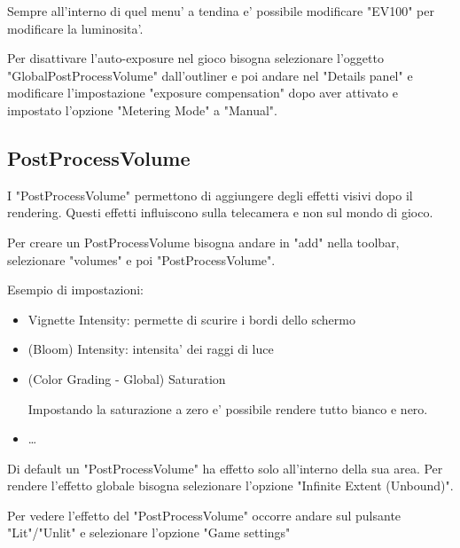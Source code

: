             Sempre all'interno di quel menu' a tendina e' possibile modificare "EV100" per modificare la luminosita'.

            Per disattivare l'auto-exposure nel gioco bisogna selezionare l'oggetto "GlobalPostProcessVolume" dall'outliner e poi andare nel "Details panel" e modificare l'impostazione  "exposure compensation" dopo aver attivato e impostato l'opzione "Metering Mode" a "Manual".


        \subsection{PostProcessVolume}
            I "PostProcessVolume" permettono di aggiungere degli effetti visivi dopo il rendering. Questi effetti influiscono sulla telecamera e non sul mondo di gioco.

            Per creare un PostProcessVolume bisogna andare in "add" nella toolbar, selezionare "volumes" e poi "PostProcessVolume".

            Esempio di impostazioni:
            \begin{itemize}
                \item Vignette Intensity: permette di scurire i bordi dello schermo
                \item (Bloom) Intensity: intensita' dei raggi di luce
                \item (Color Grading - Global) Saturation

                    \begin{notebox}
                        Impostando la saturazione a zero e' possibile rendere tutto bianco e nero.
                    \end{notebox}

                \item \dots
            \end{itemize}

            Di default un "PostProcessVolume" ha effetto solo all'interno della sua area. Per rendere l'effetto globale bisogna selezionare l'opzione "Infinite Extent (Unbound)".

            \begin{notebox}
                Per vedere l'effetto del "PostProcessVolume" occorre andare sul pulsante "Lit"/"Unlit" e selezionare l'opzione "Game settings"
            \end{notebox}


